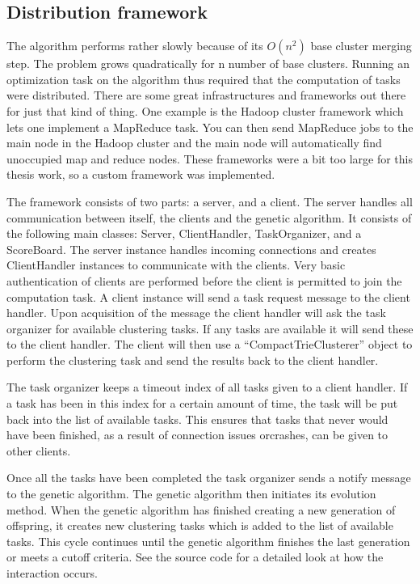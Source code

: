 \subsection{Distribution framework}
The \CTC algorithm performs rather slowly because of its \(O(n^2)\) base cluster merging step. The problem grows quadratically for n number of base clusters. Running an optimization task on the algorithm thus required that the computation of tasks were distributed. There are some great infrastructures and frameworks out there for just that kind of thing. One example is the Hadoop cluster framework which lets one implement a MapReduce task. You can then send MapReduce jobs to the main node in the Hadoop cluster and the main node will automatically find unoccupied map and reduce nodes. These frameworks were a bit too large for this thesis work, so a custom framework was implemented.

The framework consists of two parts: a server, and a client. The server handles all communication between itself, the clients and the genetic algorithm. It consists of the following main classes: Server, ClientHandler, TaskOrganizer, and a ScoreBoard. The server instance handles incoming connections and creates ClientHandler instances to communicate with the clients. Very basic authentication of clients are performed before the client is permitted to join the computation task. A client instance will send a task request message to the client handler. Upon acquisition of the message the client handler will ask the task organizer for available clustering tasks. If any tasks are available it will send these to the client handler. The client will then use a ``CompactTrieClusterer'' object to perform the clustering task and send the results back to the client handler.

The task organizer keeps a timeout index of all tasks given to a client handler. If a task has been in this index for a certain amount of time, the task will be put back into the list of available tasks. This ensures that tasks that never would have been finished, as a result of connection issues orcrashes, can be given to other clients.

Once all the tasks have been completed the task organizer sends a notify message to the genetic algorithm. The genetic algorithm then initiates its evolution method. When the genetic algorithm has finished creating a new generation of offspring, it creates new clustering tasks which is added to the list of available tasks. This cycle continues until the genetic algorithm finishes the last generation or meets a cutoff criteria. See the source code for a detailed look at how the interaction occurs.